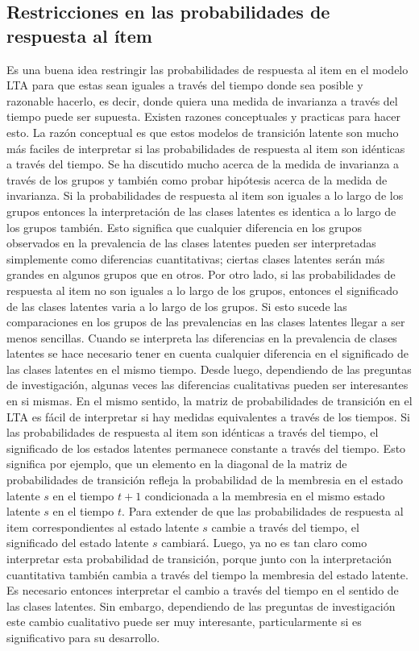 		\subsection{Restricciones en las probabilidades de respuesta al \'{i}tem}
			Es una buena idea restringir las probabilidades de respuesta al item en el modelo LTA para que estas sean iguales a trav\'{e}s del tiempo donde sea posible y razonable hacerlo, es decir, donde quiera una medida de invarianza a trav\'{e}s del tiempo puede ser supuesta. Existen razones conceptuales y practicas para hacer esto.
			La raz\'{o}n conceptual es que estos modelos de transici\'{o}n latente son mucho m\'{a}s faciles de interpretar si las probabilidades de respuesta al item son id\'{e}nticas a trav\'{e}s del tiempo. Se ha discutido mucho acerca de la medida de invarianza a trav\'{e}s de los grupos y tambi\'{e}n como probar hip\'{o}tesis acerca de la medida de invarianza. Si la probabilidades de respuesta al item son iguales a lo largo de los grupos entonces la interpretaci\'{o}n de las clases latentes es identica a lo largo de los grupos tambi\'{e}n. Esto significa que cualquier diferencia en los grupos observados en la prevalencia de las clases latentes pueden ser interpretadas simplemente como diferencias cuantitativas; ciertas clases latentes ser\'{a}n m\'{a}s grandes en algunos grupos que en otros. Por otro lado, si las probabilidades de respuesta al item no son iguales a lo largo de los grupos, entonces el significado de las clases latentes varia a lo largo de los grupos.
			Si esto sucede las comparaciones en los grupos de las prevalencias en las clases latentes llegar a ser menos sencillas. Cuando se interpreta las diferencias en la prevalencia de clases latentes se hace necesario tener en cuenta cualquier diferencia en el significado de las clases latentes en el mismo tiempo. Desde luego, dependiendo de las preguntas de investigaci\'{o}n, algunas veces las diferencias cualitativas pueden ser interesantes en si mismas.
			En el mismo sentido, la matriz de probabilidades de transici\'{o}n en el LTA es f\'{a}cil de interpretar si hay medidas equivalentes a trav\'{e}s de los tiempos. Si las probabilidades de respuesta al item son id\'{e}nticas a trav\'{e}s del tiempo, el significado de los estados latentes permanece constante a trav\'{e}s del tiempo. Esto significa por ejemplo, que un elemento en la diagonal de la matriz de probabilidades de transici\'{o}n refleja la probabilidad de la membresia en el estado latente $s$ en el tiempo $t+1$ condicionada a la membresia en el mismo estado latente $s$ en el tiempo $t$. Para extender de que las probabilidades de respuesta al item correspondientes al estado latente $s$ cambie a trav\'{e}s del tiempo, el significado del estado latente $s$ cambiar\'{a}. Luego, ya no es tan claro como interpretar esta probabilidad de transici\'{o}n, porque junto con la interpretaci\'{o}n cuantitativa tambi\'{e}n cambia a trav\'{e}s del tiempo la membresia del estado latente. Es necesario entonces interpretar el cambio a trav\'{e}s del tiempo en el sentido de las clases latentes. Sin embargo, dependiendo de las preguntas de investigaci\'{o}n este cambio cualitativo puede ser muy interesante, particularmente si es significativo para su desarrollo.           
			
